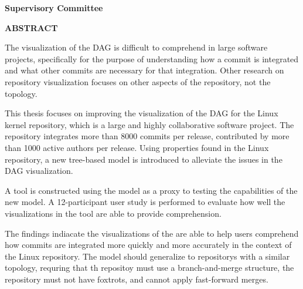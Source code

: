 \newpage
{}

\noindent \textbf{Supervisory Committee}
\tpbreak
\panel

\begin{flushleft}
  \textbf{ABSTRACT}

  The visualization of the DAG is difficult to comprehend in large
  software projects, specifically for the purpose of understanding how a
  commit is integrated and what other commits are necessary for that
  integration. Other research on repository visualization focuses on
  other aspects of the repository, not the topology.

  This thesis focuses on improving the visualization of the DAG for the
  Linux kernel repository, which is a large and highly collaborative
  software project. The repository integrates more than 8000 commits per
  release, contributed by more than 1000 active authors per release.
  Using properties found in the Linux repository, a new tree-based model
  is introduced to alleviate the issues in the DAG visualization.

  A tool is constructed using the \mt{} model as a proxy to testing the
  capabilities of the new model. A 12-participant user study is
  performed to evaluate how well the visualizations in the tool are able
  to provide comprehension.

  The findings indiacate the visualizations of the \mt{} are able to
  help users comprehend how commits are integrated more quickly and more
  accurately in the context of the Linux repository. The model should
  generalize to repositorys with a similar topology, requring that th
  repositoy must use a branch-and-merge structure, the repository must
  not have foxtrots, and cannot apply fast-forward merges.

\end{flushleft}
